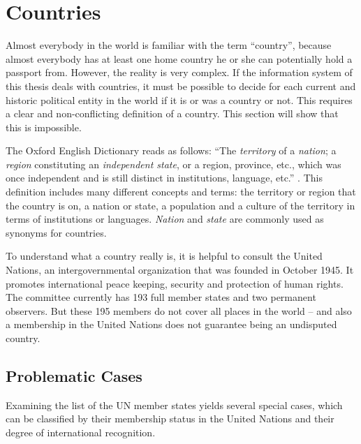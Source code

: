 \section{Countries} %
\label{sec:countries}

Almost everybody in the world is familiar with the term ``country'', because almost everybody has at least one home country he or she can potentially hold a passport from. However, the reality is very complex. If the information system of this thesis deals with countries, it must be possible to decide for each current and historic political entity in the world if it is or was a country or not. This requires a clear and non-conflicting definition of a country. This section will show that this is impossible.

The Oxford English Dictionary reads as follows: ``The \emph{territory} of a \emph{nation}; a \emph{region} constituting an \emph{independent state}, or a region, province, etc., which was once independent and is still distinct in institutions, language, etc.'' \cite{oxendict}.
This definition includes many different concepts and terms: the territory or region that the country is on, a nation or state, a population and a culture of the territory in terms of institutions or languages. \emph{Nation} and \emph{state} are commonly used as synonyms for countries.

To understand what a country really is, it is helpful to consult the United Nations, an intergovernmental organization that was founded in October 1945. It promotes international peace keeping, security and protection of human rights. The committee currently has 193 full member states and two permanent observers\cite{UNmembers}. But these 195 members do not cover all places in the world -- and also a membership in the United Nations does not guarantee being an undisputed country.

\subsection{Problematic Cases} %
\label{sub:special_cases}

Examining the list of the UN member states yields several special cases, which can be classified by their membership status in the United Nations and their degree of international recognition.


